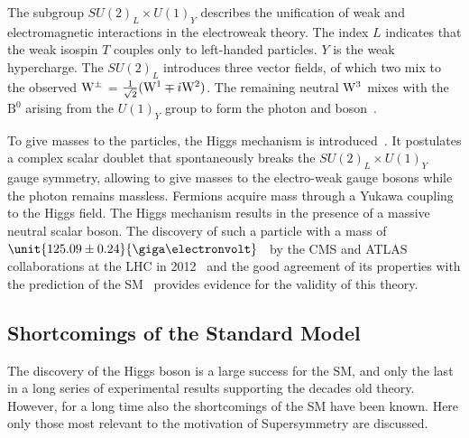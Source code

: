 The subgroup $SU(2)_L \times U(1)_Y$ describes the unification of weak and electromagnetic interactions in the electroweak theory. The index $L$ indicates that the weak isospin $T$ couples only to left-handed particles. $Y$ is the weak hypercharge. The $SU(2)_L$ introduces three vector fields, of which two mix to the observed $\mathrm{W}^{\pm}$ = $\frac{1}{\sqrt{2}}(\mathrm{W}^1\mp i\mathrm{W}^2)$. The remaining neutral $\mathrm{W}^3$ mixes with the $\mathrm{B}^0$ arising from the $U(1)_Y$ group to form the photon and \Z boson~\cite{HalzenMartin}.

To give masses to the particles, the Higgs mechanism is introduced~\cite{PhysRevLett.13.508,PhysRevLett.13.321,PhysRevLett.13.585}. It postulates a complex scalar doublet that spontaneously breaks the $SU(2)_L \times U(1)_Y$ gauge symmetry, allowing to give masses to the electro-weak gauge bosons while the photon remains massless. Fermions acquire mass through a Yukawa coupling to the Higgs field. The Higgs mechanism results in the presence of a massive neutral scalar boson. The discovery of such a particle with a mass of $\unit{125.09\pm0.24}{\giga\electronvolt}$~\cite{Aad:2015zhl} by the CMS and ATLAS collaborations at the LHC in 2012~\cite{Chatrchyan:2012ufa,Aad:2012tfa} and the good agreement of its properties with the prediction of the SM~\cite{Khachatryan:2014jba} provides evidence for the validity of this theory.   

\subsection*{Shortcomings of the Standard Model}
The discovery of the Higgs boson is a large success for the SM, and only the last in a long series of experimental results supporting the decades old theory. However, for a long time also the shortcomings of the SM have been known. Here only those most relevant to the motivation of Supersymmetry are discussed.

